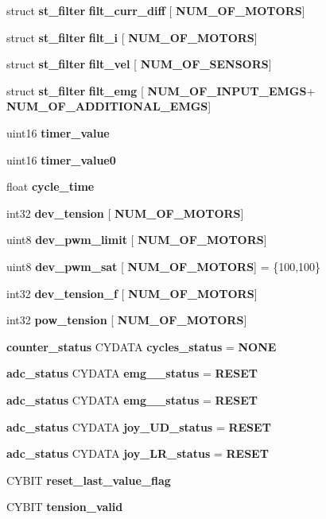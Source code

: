 \begin{DoxyCompactItemize}
struct \textbf{ st\+\_\+filter} {\bfseries filt\+\_\+curr\+\_\+diff} [\textbf{ N\+U\+M\+\_\+\+O\+F\+\_\+\+M\+O\+T\+O\+RS}]
\item 
struct \textbf{ st\+\_\+filter} \textbf{ filt\+\_\+i} [\textbf{ N\+U\+M\+\_\+\+O\+F\+\_\+\+M\+O\+T\+O\+RS}]
\item 
struct \textbf{ st\+\_\+filter} \textbf{ filt\+\_\+vel} [\textbf{ N\+U\+M\+\_\+\+O\+F\+\_\+\+S\+E\+N\+S\+O\+RS}]
\item 
struct \textbf{ st\+\_\+filter} \textbf{ filt\+\_\+emg} [\textbf{ N\+U\+M\+\_\+\+O\+F\+\_\+\+I\+N\+P\+U\+T\+\_\+\+E\+M\+GS}+\textbf{ N\+U\+M\+\_\+\+O\+F\+\_\+\+A\+D\+D\+I\+T\+I\+O\+N\+A\+L\+\_\+\+E\+M\+GS}]
\item 
uint16 \textbf{ timer\+\_\+value}
\item 
uint16 \textbf{ timer\+\_\+value0}
\item 
float \textbf{ cycle\+\_\+time}
\item 
int32 \textbf{ dev\+\_\+tension} [\textbf{ N\+U\+M\+\_\+\+O\+F\+\_\+\+M\+O\+T\+O\+RS}]
\item 
uint8 \textbf{ dev\+\_\+pwm\+\_\+limit} [\textbf{ N\+U\+M\+\_\+\+O\+F\+\_\+\+M\+O\+T\+O\+RS}]
\item 
uint8 \textbf{ dev\+\_\+pwm\+\_\+sat} [\textbf{ N\+U\+M\+\_\+\+O\+F\+\_\+\+M\+O\+T\+O\+RS}] = \{100,100\}
\item 
int32 \textbf{ dev\+\_\+tension\+\_\+f} [\textbf{ N\+U\+M\+\_\+\+O\+F\+\_\+\+M\+O\+T\+O\+RS}]
\item 
int32 \textbf{ pow\+\_\+tension} [\textbf{ N\+U\+M\+\_\+\+O\+F\+\_\+\+M\+O\+T\+O\+RS}]
\item 
\textbf{ counter\+\_\+status} C\+Y\+D\+A\+TA \textbf{ cycles\+\_\+status} = \textbf{ N\+O\+NE}
\item 
\textbf{ adc\+\_\+status} C\+Y\+D\+A\+TA \textbf{ emg\+\_\+\_\+status} = \textbf{ R\+E\+S\+ET}
\item 
\textbf{ adc\+\_\+status} C\+Y\+D\+A\+TA \textbf{ emg\+\_\+\_\+status} = \textbf{ R\+E\+S\+ET}
\item 
\textbf{ adc\+\_\+status} C\+Y\+D\+A\+TA \textbf{ joy\+\_\+\+U\+D\+\_\+status} = \textbf{ R\+E\+S\+ET}
\item 
\textbf{ adc\+\_\+status} C\+Y\+D\+A\+TA \textbf{ joy\+\_\+\+L\+R\+\_\+status} = \textbf{ R\+E\+S\+ET}
\item 
C\+Y\+B\+IT \textbf{ reset\+\_\+last\+\_\+value\+\_\+flag}
\item 
C\+Y\+B\+IT \textbf{ tension\+\_\+valid}
\item 

\end{DoxyCompactItemize}
